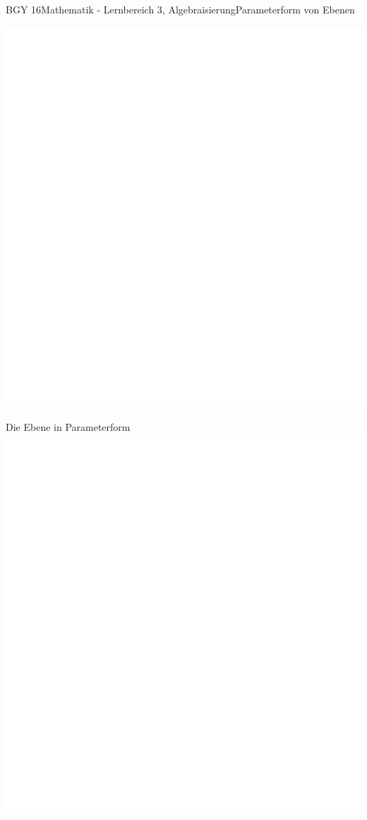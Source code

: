 \documentclass[oneside,openany,headings=optiontotoc,11pt,numbers=noenddot]{scrreprt}
\begin{document}
\begin{worksheet}{BGY 16}{Mathematik - Lernbereich 3, Algebraisierung}{Parameterform von Ebenen}
\begin{framed}
			\includegraphics[scale=0.35]{../empty.jpg}
		\end{framed}
		\begin{framed}
			\tiny{\color{codegray}Die Ebene in Parameterform}\\
			\includegraphics[scale=0.5]{../empty.jpg}

\end{framed}
\end{worksheet}
\end{document}
